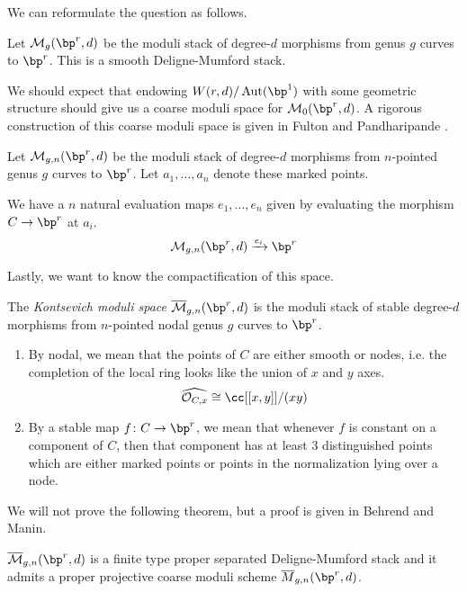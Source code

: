 \documentclass[12pt]{article}
\begin{document}
We can reformulate the question as follows.

\begin{defn}
  Let $\calm_g(\bp^r,d)$ be the moduli stack of degree-$d$ morphisms from genus $g$ curves to $\bp^r$. This is a smooth Deligne-Mumford stack.
\end{defn}

We should expect that endowing $W(r,d)/\Aut(\bp^1)$ with some geometric structure should give us a coarse moduli space for $\calm_0(\bp^r,d)$. A rigorous construction of this coarse moduli space is given in Fulton and Pandharipande \cite{FP}.

\begin{defn}
  Let $\calm_{g,n}(\bp^r, d)$ be the moduli stack of degree-$d$ morphisms from $n$-pointed genus $g$ curves to $\bp^r$. Let $a_1,\ldots,a_n$ denote these marked points.
\end{defn}

\begin{rem}
  We have a $n$ natural evaluation maps $e_1,\ldots,e_n$ given by evaluating the morphism $C \to \bp^r$ at $a_i$.
  \[\calm_{g,n}(\bp^r, d) \xrightarrow{e_i} \bp^r\]
\end{rem}

Lastly, we want to know the compactification of this space.
\begin{defn}
  The \textit{Kontsevich moduli space} $\overline{\calm}_{g,n}(\bp^r,d)$ is the moduli stack of stable degree-$d$ morphisms from $n$-pointed nodal genus $g$ curves to $\bp^r$.
  \begin{enumerate}[label=(\roman*)]
      \item By nodal, we mean that the points of $C$ are either smooth or nodes, i.e. the completion of the local ring looks like the union of $x$ and $y$ axes.
      \[\widehat{\calo_{C,x}} \cong \cc[[x,y]]/(xy)\]
      \item By a stable map $f \colon C \to \bp^r$, we mean that whenever $f$ is constant on a component of $C$, then that component has at least $3$ distinguished points which are either marked points or points in the normalization lying over a node.
  \end{enumerate}
  
\end{defn}

We will not prove the following theorem, but a proof is given in Behrend and Manin.\cite{BM}

\begin{thm}
  $\overline{\calm}_{g,n}(\bp^r, d)$ is a finite type proper separated Deligne-Mumford stack and it admits a proper projective coarse moduli scheme $\overline{M}_{g,n}(\bp^r,d)$.
\end{thm}
\end{document}
